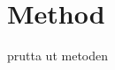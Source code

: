 \documentclass[../main2.tex]{subfiles}
\providecommand{\rootdir}{..}
\begin{document}
\section{Method}
prutta ut metoden

\end{document}
